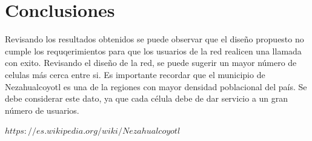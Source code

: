 \documentclass[11pt,letterpaper]{article}
\begin{document}
\newpage
\section{Conclusiones}
Revisando los resultados obtenidos se puede observar que el diseño propuesto no cumple los 
requqerimientos para que los usuarios de la red realicen una llamada con exito. Revisando el 
diseño de la red, se puede sugerir un mayor número de celulas más cerca entre si. Es importante 
recordar que el municipio de Nezahualcoyotl es una de la regiones con mayor densidad poblacional 
del país. Se debe considerar este dato, ya que cada célula debe de dar servicio a un gran número 
de usuarios. 

\begin{thebibliography}{20}
    $https://es.wikipedia.org/wiki/Nezahualcoyotl$

\end{thebibliography}
\end{document}
